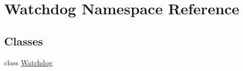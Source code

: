 \hypertarget{namespace_watchdog}{\section{Watchdog Namespace Reference}
\label{namespace_watchdog}
}
\subsection*{Classes}
\begin{DoxyCompactItemize}
\item 
class \hyperlink{class_watchdog_1_1_watchdog}{Watchdog}
\end{DoxyCompactItemize}
